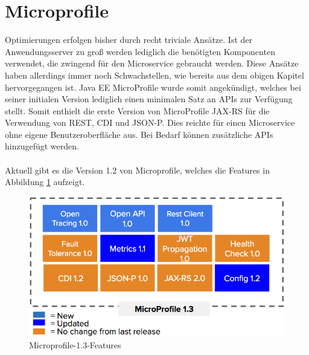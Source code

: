 \section{Microprofile}
Optimierungen erfolgen bisher durch recht triviale Ansätze. Ist der Anwendungsserver zu groß werden lediglich die benötigten Komponenten verwendet, die zwingend für den Microservice gebraucht werden. Diese Ansätze haben allerdings immer noch Schwachstellen, wie bereits aus dem obigen Kapitel hervorgegangen ist. Java EE MicroProfile wurde somit angekündigt, welches bei seiner initialen Version lediglich einen minimalen Satz an APIs zur Verfügung stellt. Somit enthielt die erste Version von MicroProfile JAX-RS für die Verwendung von REST, CDI und JSON-P. Dies reichte für einen Microservice ohne eigene Benutzeroberfläche aus. Bei Bedarf können zusätzliche APIs hinzugefügt werden. \\ \\

Aktuell gibt es die Version 1.2 von Microprofile, welches die Features in Abbildung \ref{fig:features1.3} aufzeigt.

\begin{figure}[h!]
	\centering
	\includegraphics[width=1.0\linewidth]{images/Microprofile13}
	\caption{Microprofile-1.3-Features \cite{Microprofile.2017}} %
	\label{fig:features1.3}
\end{figure}

